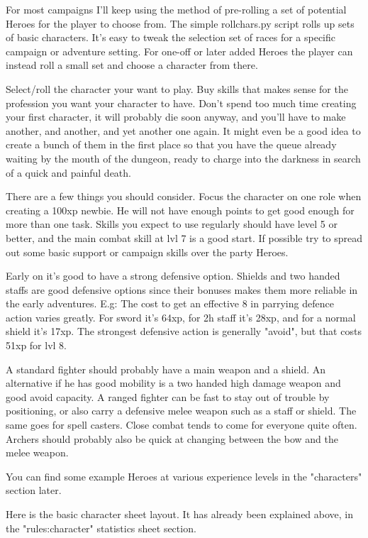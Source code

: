 For most campaigns I'll keep using the method of pre-rolling a set of potential Heroes for the player to choose from. The simple rollchars.py script rolls up sets of basic characters. It's easy to tweak the selection set of races for a specific campaign or adventure setting.
For one-off or later added Heroes the player can instead roll a small set and choose a character from there.

Select/roll the character your want to play. Buy skills that makes sense for the profession you want your character to have. Don't spend too much time creating your first character, it will probably die soon anyway, and you'll have to make another, and another, and yet another one again. It might even be a good idea to create a bunch of them in the first place so that you have the queue already waiting by the mouth of the dungeon, ready to charge into the darkness in search of a quick and painful death.

There are a few things you should consider. Focus the character on one role when creating a 100xp newbie. He will not have enough points to get good enough for more than one task. Skills you expect to use regularly should have level 5 or better, and the main combat skill at lvl 7 is a good start. If possible try to spread out some basic support or campaign skills over the party Heroes.

Early on it's good to have a strong defensive option. Shields and two handed staffs are good defensive options since their bonuses makes them more reliable in the early adventures. E.g: The cost to get an effective 8 in parrying defence action varies greatly. For sword it's 64xp, for 2h staff it's 28xp, and for a normal shield it's 17xp. The strongest defensive action is generally "avoid", but that costs 51xp for lvl 8.

A standard fighter should probably have a main weapon and a shield. An alternative if he has good mobility is a two handed high damage weapon and good avoid capacity. A ranged fighter can be fast to stay out of trouble by positioning, or also carry a defensive melee weapon such as a staff or shield. The same goes for spell casters. Close combat tends to come for everyone quite often. Archers should probably also be quick at changing between the bow and the melee weapon.

You can find some example Heroes at various experience levels in the "characters" section later.

Here is the basic character sheet layout. It has already been explained above, in the "rules:character" statistics sheet section.

